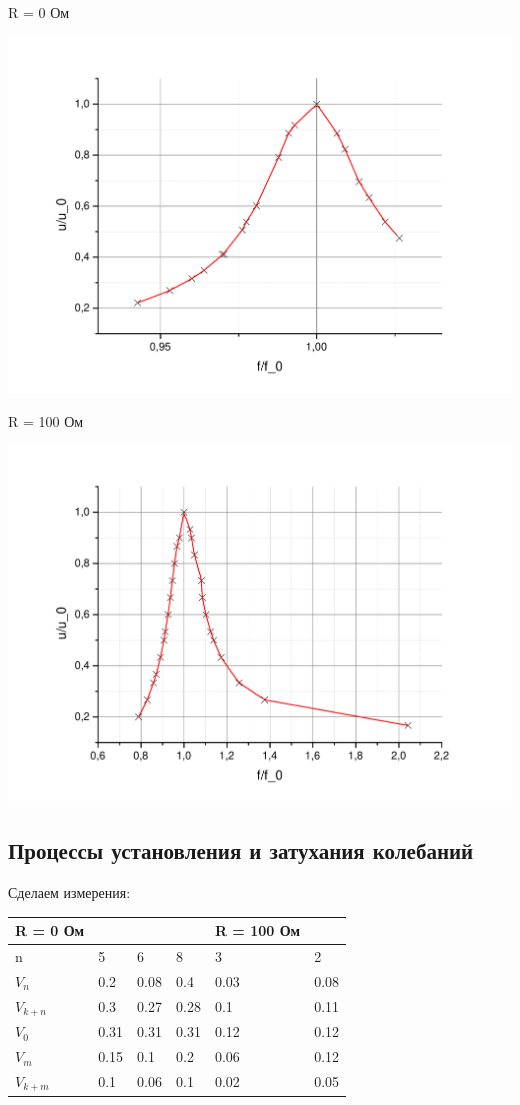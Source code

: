 \documentclass[a4paper,12pt]{article}
\begin{document}
		
		R = 0 Ом
		
		\includegraphics[width = 0.7\linewidth]{graph1}
		
		R = 100 Ом
		
		\includegraphics[width = 0.7\linewidth]{graph2}
		
		
		\subsection{Процессы установления и затухания колебаний}
		Сделаем измерения:
		
	\begin{table}[h]
		\begin{tabular}{| l | l | l | l || l | l |}
			\hline
			R = 0 Ом  &      &      &      & R = 100 Ом &      \\ \hline
			n         & 5    & 6    & 8    & 3          & 2    \\ \hline
			$V_n$     & 0.2  & 0.08 & 0.4  & 0.03       & 0.08 \\ \hline
			$V_{k+n}$ & 0.3  & 0.27 & 0.28 & 0.1        & 0.11 \\ \hline
			$V_0$     & 0.31 & 0.31 & 0.31 & 0.12       & 0.12 \\ \hline
			$V_{m}$   & 0.15 & 0.1  & 0.2  & 0.06       & 0.12 \\ \hline
			$V_{k+m}$ & 0.1  & 0.06 & 0.1  & 0.02       & 0.05 \\ \hline
		\end{tabular}
	\end{table}
	
\end{document}
